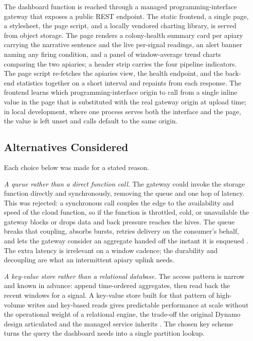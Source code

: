 \documentclass[conference]{IEEEtran}
\begin{document}
The dashboard function is reached through a managed programming-interface gateway that exposes a public REST endpoint. The static frontend, a single page, a stylesheet, the page script, and a locally vendored charting library, is served from object storage. The page renders a colony-health summary card per apiary carrying the narrative sentence and the live per-signal readings, an alert banner naming any firing condition, and a panel of window-average trend charts comparing the two apiaries; a header strip carries the four pipeline indicators. The page script re-fetches the apiaries view, the health endpoint, and the back-end statistics together on a short interval and repaints from each response. The frontend learns which programming-interface origin to call from a single inline value in the page that is substituted with the real gateway origin at upload time; in local development, where one process serves both the interface and the page, the value is left unset and calls default to the same origin.

\subsection{Alternatives Considered}

Each choice below was made for a stated reason.

\textit{A queue rather than a direct function call.} The gateway could invoke the storage function directly and synchronously, removing the queue and one hop of latency. This was rejected: a synchronous call couples the edge to the availability and speed of the cloud function, so if the function is throttled, cold, or unavailable the gateway blocks or drops data and back pressure reaches the hives. The queue breaks that coupling, absorbs bursts, retries delivery on the consumer's behalf, and lets the gateway consider an aggregate handed off the instant it is enqueued \cite{hohpe2003}. The extra latency is irrelevant on a window cadence; the durability and decoupling are what an intermittent apiary uplink needs.

\textit{A key-value store rather than a relational database.} The access pattern is narrow and known in advance: append time-ordered aggregates, then read back the recent windows for a signal. A key-value store built for that pattern of high-volume writes and key-based reads gives predictable performance at scale without the operational weight of a relational engine, the trade-off the original Dynamo design articulated and the managed service inherits \cite{decandia2007, elhemali2022}. The chosen key scheme turns the query the dashboard needs into a single partition lookup.
\end{document}
